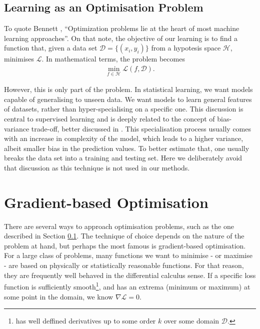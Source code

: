 \subsection{Learning as \MakeLowercase{a}n Optimisation Problem}\label{subsec:Learning as opt}

To quote Bennett \cite{bennett2006interplay}, ``Optimization problems lie at the heart of most machine learning approaches''. On that note, the objective of our learning is to find a function that, given a data set $\mathcal{D} = \{(x_i, y_i)\}$ from a hypotesis space $\mathcal{H}$, minimises $\mathcal{L}$. In mathematical terms, the problem becomes
\begin{align}
    \min_{f \in \mathcal{H}}\mathcal{L}(f, \mathcal{D}).
    \label{eq:min_prob}
\end{align}

However, this is only part of the problem. In statistical learning, we want models capable of generalising to unseen data. We want models to learn general features of datasets, rather than hyper-specialising on a specific one. This discussion is central to supervised learning and is deeply related to the concept of bias-variance trade-off, better discussed in \cite{hastie2009elements}. This specialisation process usually comes with an increase in complexity of the model, which leads to a higher variance, albeit smaller bias in the prediction values. To better estimate that, one usually breaks the data set into a training and testing set. Here we deliberately avoid that discussion as this technique is not used in our methods.

\section{Gradient-based Optimisation}\label{sec:Gradient-based optimisation}
There are several ways to approach optimisation problems, such as the one described in Section \ref{subsec:Learning as opt}. The technique of choice depends on the nature of the problem at hand, but perhaps the most famous is gradient-based optimisation. For a large class of problems, many functions we want to minimise - or maximise - are based on physically or statistically reasonable functions. For that reason, they are frequently well behaved in the differential calculus sense. If a specific loss function is sufficiently smooth\footnote{has well deffined derivatives up to some order $k$ over some domain $\mathcal{D}$. }, and has an extrema (minimum or maximum) at some point in the domain, we know $\nabla\mathcal{L} = 0$. 

